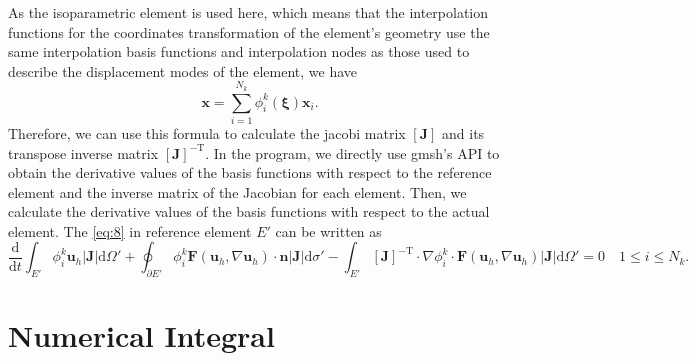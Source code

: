 \documentclass{develop-note}
\begin{document}
As the isoparametric element is used here, which means that the interpolation functions for the coordinates transformation of the element's geometry use the same interpolation basis functions and interpolation nodes as those used to describe the displacement modes of the element, we have
\begin{equation}
  \mathbf{x}=\sum_{i=1}^{N_{k}}\phi_{i}^{k}(\bm{\xi})\mathbf{x}_{i}.
\end{equation}
Therefore, we can use this formula to calculate the jacobi matrix $[\mathbf{J}]$ and its transpose inverse matrix $[\mathbf{J}]^{-\mathrm{T}}$. In the program, we directly use gmsh's API to obtain the derivative values of the basis functions with respect to the reference element and the inverse matrix of the Jacobian for each element. Then, we calculate the derivative values of the basis functions with respect to the actual element. The \autoref{eq:8} in reference element $E'$ can be written as
\begin{equation}
  \dfrac{\mathrm{d}}{\mathrm{d}t}\int_{E'}\phi_{i}^{k}\mathbf{u}_{h}|\mathbf{J}|\mathrm{d}\Omega'+\oint_{\partial E'}\phi_{i}^{k}\mathbf{F}(\mathbf{u}_{h},\nabla\mathbf{u}_{h})\cdot\mathbf{n}|\mathbf{J}|\mathrm{d}\sigma'-\int_{E'}[\mathbf{J}]^{-\mathrm{T}}\cdot\nabla\phi_{i}^{k}\cdot\mathbf{F}(\mathbf{u}_{h},\nabla\mathbf{u}_{h})|\mathbf{J}|\mathrm{d}\Omega'=0\quad 1\leqslant i\leqslant N_{k}.
\end{equation}



\section{Numerical Integral}
\end{document}

